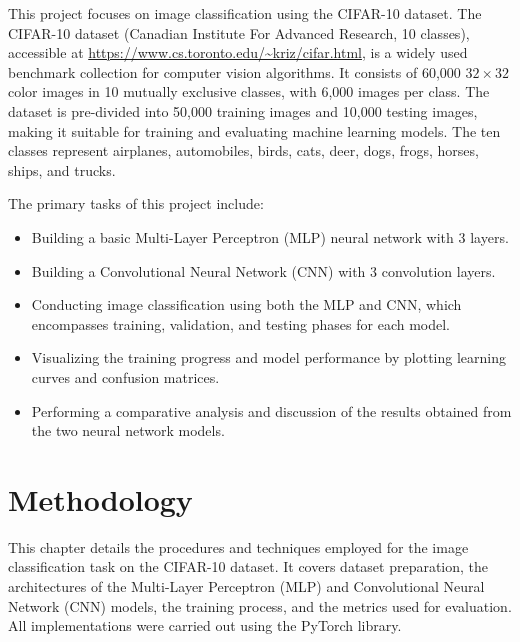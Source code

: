 \documentclass[12pt, a4paper]{report}
\begin{document}
This project focuses on image classification using the CIFAR-10 dataset.
The CIFAR-10 dataset (Canadian Institute For Advanced Research, 10 classes), accessible at \url{https://www.cs.toronto.edu/~kriz/cifar.html}, is a widely used benchmark collection for computer vision algorithms.
It consists of 60,000 $32 \times 32$ color images in 10 mutually exclusive classes, with 6,000 images per class.
The dataset is pre-divided into 50,000 training images and 10,000 testing images, making it suitable for training and evaluating machine learning models.
The ten classes represent airplanes, automobiles, birds, cats, deer, dogs, frogs, horses, ships, and trucks.

\noindent The primary tasks of this project include:
\begin{itemize}
    \item Building a basic Multi-Layer Perceptron (MLP) neural network with 3 layers.
    \item Building a Convolutional Neural Network (CNN) with 3 convolution layers.
    \item Conducting image classification using both the MLP and CNN, which encompasses training, validation, and testing phases for each model.
    \item Visualizing the training progress and model performance by plotting learning curves and confusion matrices.
    \item Performing a comparative analysis and discussion of the results obtained from the two neural network models.
\end{itemize}

\chapter{Methodology}
This chapter details the procedures and techniques employed for the image classification task on the CIFAR-10 dataset.
It covers dataset preparation, the architectures of the Multi-Layer Perceptron (MLP) and Convolutional Neural Network (CNN) models, the training process, and the metrics used for evaluation.
All implementations were carried out using the PyTorch library.
\end{document}
